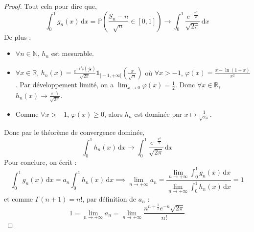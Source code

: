 \begin{proof}
		Tout cela pour dire que,
		\[ \int_0^1 g_n(x) \, \mathrm{d}x = \mathbb{P} \left( \frac{S_n - n}{\sqrt{n}} \in [0,1] \right) \longrightarrow \int_0^1 \frac{e^{-\frac{x^2}{2}}}{\sqrt{2 \pi}} \, \mathrm{d}x \]
		De plus :
		\begin{itemize}
			\item $\forall n \in \mathbb{N}$, $h_n$ est mesurable.
			\item $\forall x \in \mathbb{R}$, $h_n(x) = \frac{e^{-x^2 \varphi \left( \frac{x}{\sqrt{n}} \right)}}{\sqrt{2 \pi}} \mathbb{1}_{]-1, +\infty[} \left( \frac{x}{\sqrt{n}} \right)$ où $\forall x > -1$, $\varphi(x) = \frac{x - \ln(1+x)}{x^2}$. Par développement limité, on a $\lim_{x \rightarrow 0} \varphi(x) = \frac{1}{2}$. Donc $\forall x \in \mathbb{R}$, $h_n(x) \longrightarrow \frac{e^{-\frac{x^2}{2}}}{\sqrt{2 \pi}}$.
			\item Comme $\forall x > -1$, $\varphi(x) \geq 0$, alors $h_n$ est dominée par $x \mapsto \frac{1}{\sqrt{2 \pi}}$.
		\end{itemize}
		\medskip
		Donc par le théorème de convergence dominée,
		\[ \int_0^1 h_n(x) \, \mathrm{d}x \longrightarrow \int_0^1 \frac{e^{-\frac{x^2}{2}}}{\sqrt{2 \pi}} \, \mathrm{d}x \]
		Pour conclure, on écrit :
		\[ \int_0^1 g_n(x) \, \mathrm{d}x = a_n \int_0^1 h_n(x) \, \mathrm{d}x \implies \lim_{n \rightarrow +\infty} a_n = \frac{\lim_{n \rightarrow +\infty} \int_0^1 g_n(x) \, \mathrm{d}x}{\lim_{n \rightarrow +\infty} \int_0^1 h_n(x) \, \mathrm{d}x} = 1 \]
		et comme $\Gamma(n+1) = n!$, par définition de $a_n$ :
		\[ 1 = \lim_{n \rightarrow +\infty} a_n = \lim_{n \rightarrow +\infty} \frac{n^{n + \frac{1}{2}} e^{-n} \sqrt{2\pi}}{n!} \]
	\end{proof}


